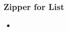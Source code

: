 \begin{frame}[fragile]
\frametitle{Zipper for List}

\begin{itemize}
\item 
\end{itemize}
\end{frame}
